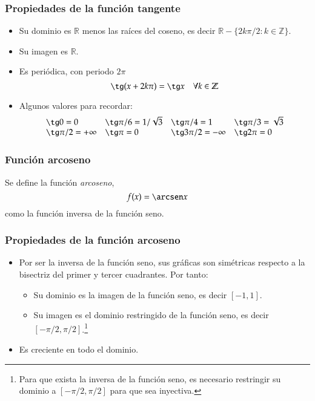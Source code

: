 \begin{frame}
\frametitle{Propiedades de la función tangente}
\begin{itemize}
\item Su dominio es $\mathbb{R}$ menos las raíces del coseno, es decir $\mathbb{R}-\{2k\pi/2: k\in \mathbb{Z}\}$.
\item Su imagen es $\mathbb{R}$.
\item Es periódica, con periodo $2\pi$
\[\tg (x+2k\pi)= \tg x\quad \forall k\in \mathbb{Z}\]
\item Algunos valores para recordar:
\[
\begin{array}{llll}
\tg 0=0 & \tg \pi/6= 1/\sqrt{3} & \tg \pi/4=1 & \tg \pi/3= \sqrt{3}\\
\tg \pi/2 =+\infty & \tg \pi =0 & \tg 3\pi/2=-\infty & \tg 2\pi=0
\end{array}
\]
\end{itemize}
\end{frame} 


\begin{frame}
\frametitle{Función arcoseno}
\begin{definicion}
Se define la función \emph{arcoseno},
\[f(x)=\arcsen x\]
como la función inversa de la función seno.
\end{definicion}
\begin{center}
\scalebox{1}{}
\end{center}
\end{frame} 



\begin{frame}
\frametitle{Propiedades de la función arcoseno}
\begin{itemize}
\item Por ser la inversa de la función seno, sus gráficas son simétricas respecto a la bisectriz del primer y tercer
cuadrantes. Por tanto:
\begin{itemize}
\item Su dominio es la imagen de la función seno, es decir $[-1,1]$.
\item Su imagen es el dominio restringido de la función seno, es decir $[-\pi/2,\pi/2]$.\footnote{Para que exista la
inversa de la función seno, es necesario restringir su dominio a $[-\pi/2,\pi/2]$ para que sea inyectiva.}
\end{itemize}
\item Es creciente en todo el dominio.
\end{itemize}
\end{frame} 



